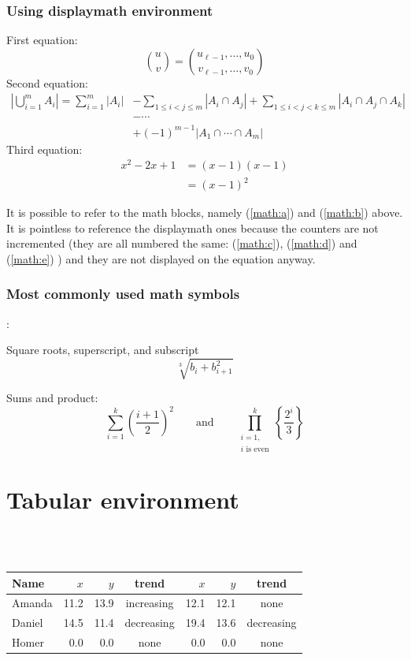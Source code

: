\documentclass[a4paper,10pt]{article}
\begin{document}
\subsubsection*{Using displaymath environment}
\noindent{}First equation:
\[
  \label{math:c}
  \binom{u}{v} = \binom{u_{\ell-1},\dots,u_0}{v_{\ell-1},\dots,v_0}
\]
Second equation:
\[
  \label{math:d}
  \begin{aligned}
    \left| \bigcup_{i=1}^m A_i \right| = \sum_{i=1}^{m} \left| A_i \right|
      &- \sum_{1\le i < j \le m} \left| A_i \cap A_j\right|
      + \sum_{1 \le i < j < k \le m} \left| A_i \cap A_j \cap A_k \right| \\
      &- \cdots 		\\
      &+ (-1)^{m-1}\left| A_1 \cap \cdots \cap A_m \right|
  \end{aligned}
\]
Third equation:
\[
  \label{math:e}
  \begin{aligned}
    x^2 - 2x + 1 &= (x-1)(x-1)\\
                 &= (x-1)^2
  \end{aligned}
\]

It is possible to refer to the math blocks, namely (\ref{math:a}) and (\ref{math:b}) above.
It is pointless to reference the displaymath ones because the counters are not incremented
(they are all numbered the same: (\ref{math:c}), (\ref{math:d}) and (\ref{math:e}) )
and they are not displayed on the equation anyway.

\subsubsection*{Most commonly used math symbols}:

Square roots, superscript, and subscript
\[
    \sqrt[3]{b_i + b_{i+1}^2}
\]

Sums and product:
\[
  \sum_{i=1}^k \left(\frac{i+1}{2}\right)^2
  \qquad\text{and}\qquad
  \prod_{\substack{i=1,\\ \text{$i$ is even}}}^k \left\{\frac{2^i}{3}\right\}
\]


\pagebreak
\renewcommand{\arraystretch}{1.4}
\section*{Tabular environment}
\ \\
\ \\

\begin{center}
\begin{tabular}{l | r r c | r r c }
\hline
\hline
  Name  & $x$ & $y$ & trend & $x$ & $y$ & trend \\
\hline
  Amanda  & 11.2 & 13.9 & increasing & 12.1 & 12.1 & none \\
  Daniel  & 14.5 & 11.4 & decreasing & 19.4 & 13.6 & decreasing \\
  Homer   &  0.0 &  0.0 & none       &  0.0 &  0.0 & none \\
\hline
\hline
\end{tabular}
\end{center}
\end{document}
